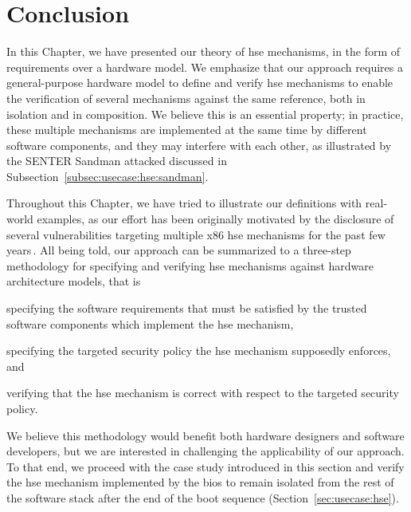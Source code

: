 \section{Conclusion}

In this Chapter, we have presented our theory of \ac{hse} mechanisms, in the
form of requirements over a hardware model.
%
We emphasize that our approach requires a general-purpose hardware model to
define and verify \ac{hse} mechanisms to enable the verification of several
mechanisms against the same reference, both in isolation and in composition.
%
We believe this is an essential property; in practice, these multiple mechanisms
are implemented at the same time by different software components, and they may
interfere with each other, as illustrated by the SENTER Sandman attacked
discussed in Subsection~\ref{subsec:usecase:hse:sandman}.

Throughout this Chapter, we have tried to illustrate our definitions with
real-world examples, as our effort has been originally motivated by the
disclosure of several vulnerabilities targeting multiple x86 \ac{hse} mechanisms
for the past few
years\,\cite{wojtczuk2009smram,duflot2009smram,rutkowska2008remap,domas2015sinkhole,kallenberg2015racecondition}.
%
All being told, our approach can be summarized to a three-step methodology for
specifying and verifying \ac{hse} mechanisms against hardware architecture
models, that is
%
\begin{inparaenum}[(1)]
\item specifying the software requirements that must be satisfied by the trusted
  software components which implement the \ac{hse} mechanism,
%
\item specifying the targeted security policy the \ac{hse} mechanism supposedly
  enforces, and
%
\item verifying that the \ac{hse} mechanism is correct with respect to the
  targeted security policy.
\end{inparaenum}
%
We believe this methodology would benefit both hardware designers and software
developers, but we are interested in challenging the applicability of our
approach.
%
To that end, we proceed with the case study introduced in this section and
verify the \ac{hse} mechanism implemented by the \ac{bios} to remain isolated
from the rest of the software stack after the end of the boot sequence
(Section~\ref{sec:usecase:hse}).
